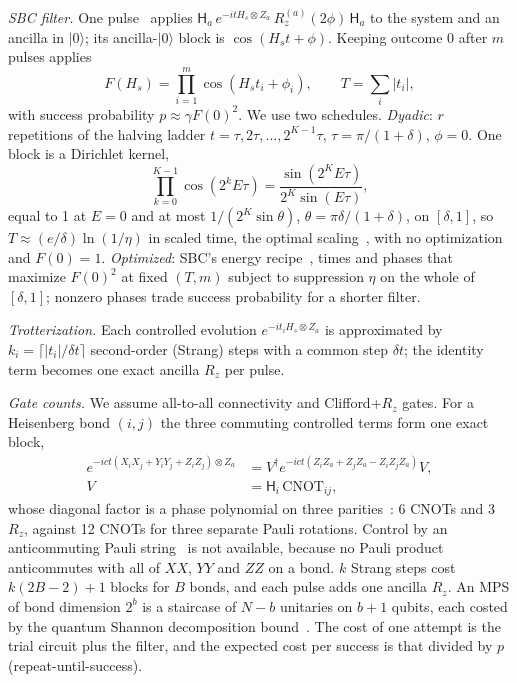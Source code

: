 \documentclass[aps,pra,twocolumn,superscriptaddress,nofootinbib]{revtex4-2}
\newcommand{\ket}[1]{|#1\rangle}
\begin{document}
\emph{SBC filter.} One pulse~\cite{Stetcu2023} applies $\mathsf H_a\,e^{-itH_s\otimes Z_a}\,R_z^{(a)}(2\phi)\,\mathsf H_a$
to the system and an ancilla in $\ket0$; its ancilla-$\ket0$ block is $\cos(H_st+\phi)$. Keeping outcome 0 after $m$
pulses applies
\begin{equation}
F(H_s)=\prod_{i=1}^m\cos(H_st_i+\phi_i),\qquad T=\sum_i|t_i|,
\end{equation}
with success probability $p\approx\gamma F(0)^2$. We use two schedules. \emph{Dyadic}: $r$ repetitions of the halving
ladder $t=\tau,2\tau,\dots,2^{K-1}\tau$, $\tau=\pi/(1+\delta)$, $\phi=0$. One block is a Dirichlet kernel,
\begin{equation}
\prod_{k=0}^{K-1}\cos(2^kE\tau)=\frac{\sin(2^KE\tau)}{2^K\sin(E\tau)},
\label{eq:dirichlet}
\end{equation}
equal to 1 at $E=0$ and at most $1/(2^K\sin\theta)$, $\theta=\pi\delta/(1+\delta)$, on $[\delta,1]$, so
$T\approx(e/\delta)\ln(1/\eta)$ in scaled time, the optimal scaling~\cite{Lin2020,CohenOh2023}, with no optimization and $F(0)=1$.
\emph{Optimized}: SBC's energy recipe~\cite{Stetcu2023}, times and phases that maximize $F(0)^2$ at fixed $(T,m)$
subject to suppression $\eta$ on the whole of $[\delta,1]$; nonzero phases trade success probability for a shorter
filter.

\emph{Trotterization.} Each controlled evolution $e^{-it_iH_s\otimes Z_a}$ is approximated by $k_i=\lceil|t_i|/\delta
t\rceil$ second-order (Strang) steps with a common step $\delta t$; the identity term becomes one exact ancilla $R_z$
per pulse.

\emph{Gate counts.} We assume all-to-all connectivity and Clifford+$R_z$ gates. For a Heisenberg bond $(i,j)$ the three
commuting controlled terms form one exact block,
\begin{align}
e^{-ict(X_iX_j+Y_iY_j+Z_iZ_j)\otimes Z_a}
&=V^\dagger e^{-ict(Z_iZ_a+Z_jZ_a-Z_iZ_jZ_a)}V,\nonumber\\
V&=\mathsf H_i\,\mathrm{CNOT}_{ij},
\label{eq:bond}
\end{align}
whose diagonal factor is a phase polynomial on three parities~\cite{Amy2014}: 6 CNOTs and 3 $R_z$, against 12 CNOTs
for three separate Pauli rotations. Control by an anticommuting Pauli string~\cite{BeeLindgren2025,Dong2022} is not
available, because no Pauli product anticommutes with all of $XX$, $YY$ and $ZZ$ on a bond. $k$ Strang steps cost
$k(2B-2)+1$ blocks for $B$ bonds, and each pulse adds one ancilla $R_z$. An MPS of bond dimension $2^b$ is a staircase
of $N-b$ unitaries on $b+1$ qubits, each costed by the quantum Shannon decomposition bound~\cite{Shende2006}. The cost
of one attempt is the trial circuit plus the filter, and the expected cost per success is that divided by $p$
(repeat-until-success).
\end{document}
